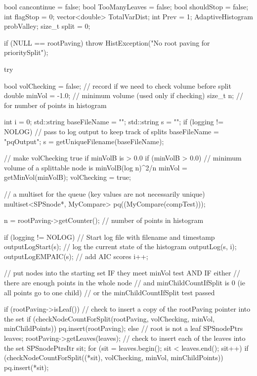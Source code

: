 \begin{DoxyCode}
{    
    bool cancontinue = false;
    bool TooManyLeaves = false;
    bool shouldStop = false;
    int flagStop = 0;
    vector<double> TotalVarDist;
    int Prev = 1;
    AdaptiveHistogram probValley;
    size_t split = 0;
    
    if (NULL == rootPaving) {
            throw HistException("No root paving for prioritySplit");
    }

    try {
        bool volChecking = false; // record if we need to check volume before
       split
        double minVol = -1.0; // minimum volume (used only if checking)
        size_t n; // for number of points in histogram

        int i = 0;
        std::string baseFileName = "";
        std::string s = "";
        if (logging != NOLOG) {
            // pass to log output to keep track of splits
            baseFileName = "pqOutput";
            s = getUniqueFilename(baseFileName);
        }

        // make volChecking true if minVolB is > 0.0
        if (minVolB > 0.0) {
            // minimum volume of a splittable node is minVolB(log n)^2/n
            minVol = getMinVol(minVolB);
           volChecking = true;
        }

        // a multiset for the queue (key values are not necessarily unique)
        multiset<SPSnode*, MyCompare> pq((MyCompare(compTest)));

        n = rootPaving->getCounter(); // number of points in histogram

        if (logging != NOLOG) {
             // Start log file with filename and timestamp
            outputLogStart(s);
            // log the current state of the histogram
            outputLog(s, i);
            outputLogEMPAIC(s); // add AIC scores
            i++;
        }

        // put nodes into the starting set IF they meet minVol test AND IF
       either
        // there are enough points in the whole node
                // and minChildCountIfSplit is 0 (ie all points go to one
       child)
        // or the minChildCountIfSplit test passed

        if (rootPaving->isLeaf()) {
            // check to insert a copy of the rootPaving pointer into the set
            if (checkNodeCountForSplit(rootPaving, volChecking, minVol,
                minChildPoints)) {
                    pq.insert(rootPaving);
            }
        }
        else { // root is not a leaf
            SPSnodePtrs leaves;
            rootPaving->getLeaves(leaves);
            // check to insert each of the leaves into the set
            SPSnodePtrsItr sit;
            for (sit = leaves.begin(); sit < leaves.end(); sit++) {
                if (checkNodeCountForSplit((*sit), volChecking, minVol,
                minChildPoints)) {
                    pq.insert(*sit);
                }
            }
        }

}}
\end{DoxyCode}
